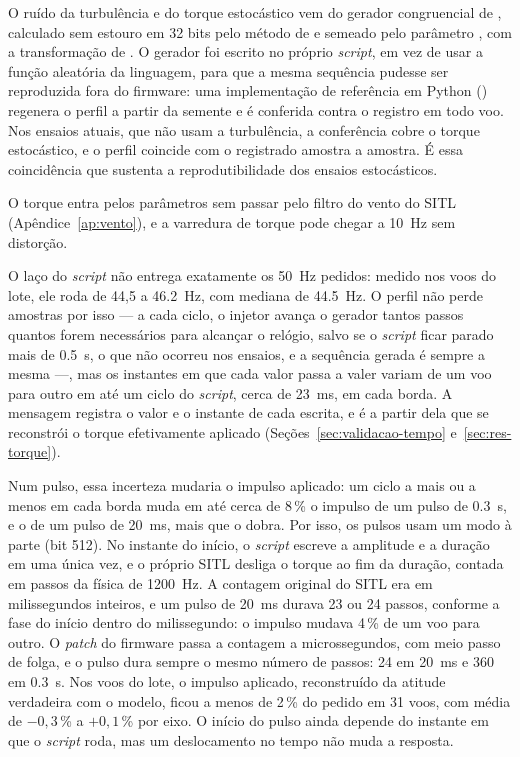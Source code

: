 O ruído da turbulência e do torque estocástico vem do gerador congruencial
de , calculado sem estouro em 32 bits pelo método de
 e semeado pelo parâmetro , com a
transformação de . O gerador foi escrito no próprio
\textit{script}, em vez de usar a função aleatória da linguagem, para que a
mesma sequência pudesse ser reproduzida fora do firmware: uma implementação
de referência em Python () regenera o
perfil a partir da semente e é conferida contra o registro em todo voo. Nos
ensaios atuais, que não usam a turbulência, a conferência cobre o torque
estocástico, e o perfil coincide com o registrado amostra a amostra. É essa
coincidência que sustenta a reprodutibilidade dos ensaios estocásticos.

O torque entra pelos parâmetros  sem passar pelo
filtro do vento do SITL (Apêndice~\ref{ap:vento}), e a varredura de torque
pode chegar a \SI{10}{\hertz} sem distorção.

O laço do \textit{script} não entrega exatamente os \SI{50}{\hertz} pedidos:
medido nos voos do lote, ele roda de 44,5 a \SI{46.2}{\hertz}, com
mediana de \SI{44.5}{\hertz}. O perfil não perde
amostras por isso --- a cada ciclo, o injetor avança o gerador tantos passos
quantos forem necessários para alcançar o relógio, salvo se o
\textit{script} ficar parado mais de \SI{0.5}{\second}, o que não ocorreu nos
ensaios, e a sequência gerada é sempre a mesma ---, mas os instantes em que
cada valor passa a valer variam de um voo para outro em até um ciclo do
\textit{script}, cerca de \SI{23}{\milli\second}, em cada borda. A mensagem
 registra o valor e o instante de cada escrita, e é a partir dela
que se reconstrói o torque efetivamente aplicado
(Seções~\ref{sec:validacao-tempo} e~\ref{sec:res-torque}).

Num pulso, essa incerteza mudaria o impulso aplicado: um ciclo a mais ou a
menos em cada borda muda em até cerca de 8\,\% o impulso de um pulso de
\SI{0.3}{\second}, e o de um pulso de \SI{20}{\milli\second}, mais que o
dobra. Por isso, os pulsos usam um modo à parte (bit 512). No instante do
início, o \textit{script} escreve a amplitude e a duração em
 uma única vez, e o próprio SITL desliga o torque ao
fim da duração, contada em passos da física de \SI{1200}{\hertz}. A contagem
original do SITL era em milissegundos inteiros, e um pulso de
\SI{20}{\milli\second} durava 23 ou 24 passos, conforme a fase do início
dentro do milissegundo: o impulso mudava 4\,\% de um voo para outro. O
\textit{patch} do firmware passa a contagem a microssegundos, com meio passo
de folga, e o pulso dura sempre o mesmo número de passos: 24 em
\SI{20}{\milli\second} e 360 em \SI{0.3}{\second}. Nos voos do lote, o
impulso aplicado, reconstruído da atitude verdadeira com o modelo, ficou a
menos de 2\,\% do pedido em 31 voos, com média de $-0{,}3$\,\% a
$+0{,}1$\,\% por eixo. O início do pulso ainda depende do instante em
que o \textit{script} roda, mas um deslocamento no tempo não muda a resposta.

